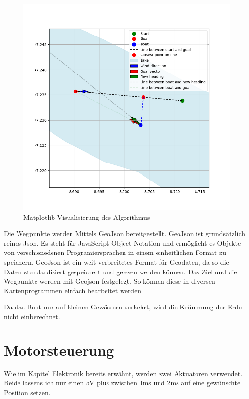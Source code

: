 \begin{figure}[H]
    \centering
    \includegraphics[width=1\linewidth]{assets/3.png}
    \caption{Matplotlib Visualisierung des Algorithmus}
    
\end{figure}

Die Wegpunkte werden Mittels GeoJson bereitgestellt. GeoJson ist grundsätzlich reines Json. Es steht für JavaScript Object Notation und ermöglicht es Objekte von verschienedenen Programiersprachen in einem einheitlichen Format zu speichern. GeoJson ist ein weit verbreitetes Format für Geodaten, da so die Daten standardisiert gespeichert und gelesen werden können.
Das Ziel und die Wegpunkte werden mit Geojson festgelegt. So können diese in diversen Kartenprogrammen einfach bearbeitet werden.

Da das Boot nur auf kleinen Gewässern verkehrt, wird die Krümmung der Erde nicht einberechnet.

\section{Motorsteuerung}
Wie im Kapitel Elektronik bereits erwähnt, werden zwei Aktuatoren verwendet. Beide lassens ich nur einen 5V plus zwischen 1ms und 2ms auf eine gewünschte Position setzen. 

